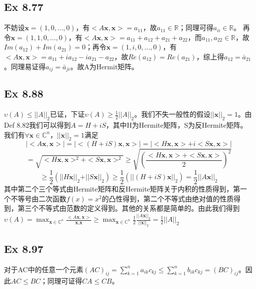 \documentclass{article}
\begin{document}
\subsection*{Ex 8.77}
\indent 不妨设$\textbf{x}=(1,0,...,0)$，有$<A\textbf{x},\textbf{x}>=a_{11}$，故$a_{11}\in\mathbb{R}$；同理可得$a_{ii}\in\mathbb{R}$。
再令$\textbf{x}=(1,1,0,...,0)$，有$<A\textbf{x},\textbf{x}>=a_{11}+a_{12}+a_{21}+a_{22}$，而$a_{11},a_{22}\in\mathbb{R}$，故$Im(a_{12})+Im(a_{21})=0$；再令$\textbf{x}=(1,i,0,...,0)$，有$<A\textbf{x},\textbf{x}>=a_{11}+ia_{12}-ia_{21}-a_{22}$，故$Re(a_{12})=Re(a_{21})$，综上得$a_{12}=\bar{a}_{21}$。同理易证得$a_{ij}=\bar{a}_{ji}$。故A为Hermit矩阵。

\subsection*{Ex 8.88}
\indent$\upsilon(A)\le\vert\vert A\vert\vert_{2}$已证，下证$\upsilon(A)\ge\frac{1}{2}\vert\vert A\vert\vert_{2}$。我们不失一般性的假设$\vert\vert \textbf{x}\vert\vert_{2}=1$。由Def 8.82我们可以得到$A=H+iS$，其中H为Hermite矩阵，S为反Hermite矩阵。我们有$\forall \textbf{x}\in \mathbb{C}^{n}，\vert\vert\textbf{x}\vert\vert_{2}=1$满足
$$
\vert<A\textbf{x},\textbf{x}>\vert=\vert<(H+iS)\textbf{x},\textbf{x}>\vert=\vert<H\textbf{x},\textbf{x}>+i<S\textbf{x},\textbf{x}>\vert
$$
$$
=\sqrt{<H\textbf{x},\textbf{x}>^{2}+<S\textbf{x},\textbf{x}>^{2}}\ge\sqrt{(\frac{<H\textbf{x},\textbf{x}>+<S\textbf{x},\textbf{x}>}{2})^{2}}
$$
$$
\ge\frac{1}{2}(\vert\vert H\textbf{x}\vert\vert_{2}+\vert\vert S\textbf{x}\vert\vert_{2})\ge\frac{1}{2}(\vert\vert (H+iS)\textbf{x}\vert\vert_{2})=\frac{1}{2}\vert\vert A\textbf{x}\vert\vert_{2}
$$
其中第二个三个等式由Hermite矩阵和反Hermite矩阵关于内积的性质得到，第一个不等号由二次函数$f(x)=x^{2}$的凸性得到，第二个不等式由绝对值的性质得到，第三个不等式由范数的定义得到。其他的关系都是简单的。由此我们得到$\upsilon(A)=\max_{\textbf{x}\in\mathbb{C}^{n}}\frac{<A\textbf{x},\textbf{x}>}{\textbf{x},\textbf{x}}\ge\max_{\textbf{x}\in\mathbb{C}^{n}}\frac{1}{2}\frac{\vert\vert A\textbf{x}\vert\vert_{2}}{\vert\vert\textbf{x}\vert\vert_{2}}=\frac{1}{2}\vert\vert A\vert\vert_{2}$

\subsection*{Ex 8.97}
\indent 对于AC中的任意一个元素$(AC)_{ij}=\sum_{	k=1}^{n}a_{ik}c_{kj}\le\sum_{	k=1}^{n}b_{ik}c_{kj}=(BC)_{ij}$。因此$AC\le BC$；同理可证得$CA\le CB$。
\end{document}
